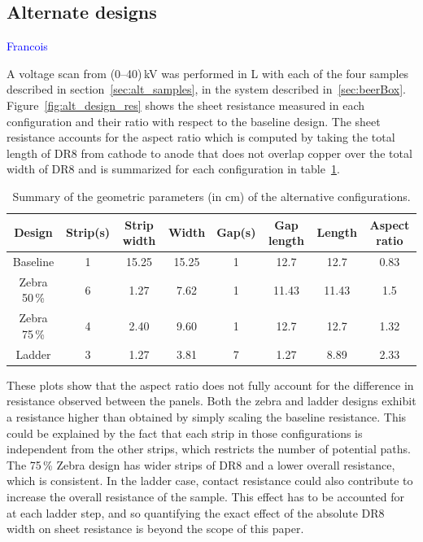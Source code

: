 \documentclass[a4paper,12pt]{article}
\begin{document}
\subsection{Alternate designs}
\textcolor{blue}{Francois}

A voltage scan from (0--40)\,kV was performed in L with each of the four samples described in section~\ref{sec:alt_samples}, in the system described in~\ref{sec:beerBox}. Figure~\ref{fig:alt_design_res} shows the sheet resistance measured in each configuration and their ratio with respect to the baseline design. The sheet resistance accounts for the aspect ratio which is computed by taking the total length of DR8 from cathode to anode that does not overlap copper over the total width of DR8 and is summarized for each configuration in table~\ref{tab:alt_design}.

\begin{table}[h]
\centering
\begin{tabular}{c|c|c|c|c|c|c|c}
	Design & Strip(s) & Strip width & Width & Gap(s) & Gap length & Length & Aspect ratio \\
	\hline
	Baseline & 1 & 15.25 & 15.25 & 1 & 12.7 & 12.7 & 0.83 \\
	Zebra 50\,\% & 6 & 1.27 & 7.62 & 1 & 11.43 & 11.43 & 1.5 \\
	Zebra 75\,\% & 4 & 2.40 & 9.60 & 1 & 12.7 & 12.7 & 1.32 \\
	Ladder & 3 & 1.27 & 3.81 & 7 & 1.27 & 8.89 & 2.33
\end{tabular}
\caption{Summary of the geometric parameters (in cm) of the alternative configurations.}
\label{tab:alt_design}
\end{table}

These plots show that the aspect ratio does not fully account for the difference in resistance observed between the panels. Both the zebra and ladder designs exhibit a resistance higher than obtained by simply scaling the baseline resistance. This could be explained by the fact that each strip in those configurations is independent from the other strips, which restricts the number of potential paths. The 75\,\% Zebra design has wider strips of DR8 and a lower overall resistance, which is consistent. In the ladder case, contact resistance could also contribute to increase the overall resistance of the sample. This effect has to be accounted for at each ladder step, and so quantifying the exact effect of the absolute DR8 width on sheet resistance is beyond the scope of this paper.
\end{document}
